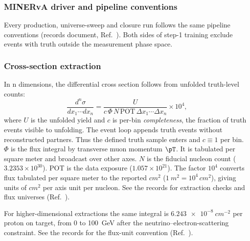 \subsubsection{MINERvA driver and pipeline conventions}
\label{sec:method-driver}



Every production, universe-sweep and closure run follows the same pipeline conventions (records document, Ref.~\cite{NoteRecords2026}). Both sides of step-1 training exclude events with truth outside the measurement phase space.


\subsubsection{Cross-section extraction}
\label{sec:method-xsec}
In n dimensions, the differential cross section follows from unfolded truth-level counts:
\begin{equation*}
  \frac{d^{n}\sigma}{d x_{1}\cdots d x_{n}}
  = \frac{U}{c\,\Phi\,N\,\mathrm{POT}\,\Delta x_{1}\cdots\Delta x_{n}}
    \times 10^{4},
\end{equation*}
where $U$ is the unfolded yield and $c$ is per-bin \emph{completeness}, the fraction of truth events visible to unfolding. The event loop appends truth events without reconstructed partners. Thus the defined truth sample enters and $c\equiv1$ per bin. $\Phi$ is the flux integral by transverse muon momentum $\pT$. It is tabulated per square meter and broadcast over other axes. $N$ is the fiducial nucleon count ($3.2353\times10^{30}$). POT is the data exposure ($1.057\times10^{21}$). The factor $10^{4}$ converts flux tabulated per square meter to the reported $\si{cm^2}$ ($\SI{1}{m^2}=10^{4}\,\si{cm^2}$), giving units of $\si{cm^2}$ per axis unit per nucleon. See the records for extraction checks and flux universes (Ref.~\cite{NoteRecords2026}).

For higher-dimensional extractions the same integral is $\SI{6.243e-8}{cm^{-2}}$ per proton on target, from 0 to \SI{100}{GeV} after the neutrino--electron-scattering constraint. See the records for the flux-unit convention (Ref.~\cite{NoteRecords2026}).


